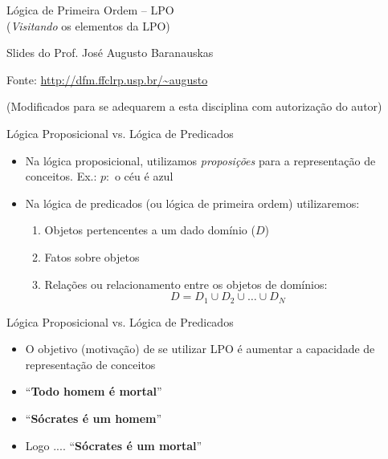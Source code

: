 \begin{frame}[t]
\vskip 2cm
\begin{center}
{\Huge Lógica de Primeira Ordem -- LPO}\\
(\textit{Visitando} os elementos da LPO)

\vskip 2cm

Slides do Prof. José Augusto Baranauskas

Fonte: \url{http://dfm.ffclrp.usp.br/~augusto} 

(Modificados para se adequarem a esta disciplina com autorização do autor)
\end{center}
\end{frame}
\begin{frame}[t]{Lógica Proposicional vs. Lógica de Predicados}
	\begin{itemize} \itemsep 1cm
	\item Na lógica proposicional, utilizamos {\em proposições} para a representação de conceitos. Ex.: $p: $ o céu é azul
	\item Na lógica de predicados (ou lógica de primeira ordem) utilizaremos:
	\begin{enumerate}
	\item Objetos pertencentes a um dado domínio ($D$)
	\item Fatos sobre objetos
	\item Relações ou relacionamento entre os objetos de domínios: $$D = D_1 \cup D_2 \cup\ldots\cup D_N$$
	\end{enumerate}
	\end{itemize}
\end{frame}

\begin{frame}[t]{Lógica Proposicional vs. Lógica de Predicados}
	\begin{itemize} \itemsep 0.6cm
	\item O objetivo (motivação) de se utilizar LPO é aumentar a capacidade de representação de conceitos

	\item ``{\bf Todo homem é mortal}''

	\item ``{\bf Sócrates é um homem}''

	\item Logo .... ``{\bf Sócrates é um mortal}''
	\end{itemize}
\end{frame}


